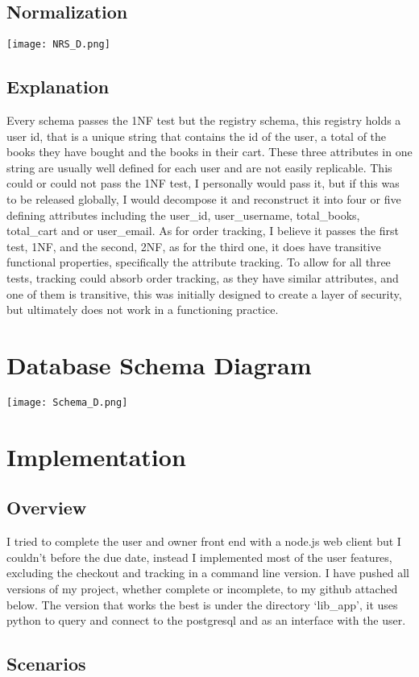\documentclass[a4 paper]{article}
\begin{document}
\subsection{Normalization}
{\centering \texttt{[image: NRS\_D.png]}}
\subsection{Explanation}
\qquad Every schema passes the 1NF test but the registry schema, this registry holds a user id, that is a unique string that contains the id of the user, a total of the books they have bought and the books in their cart. These three attributes in one string are usually well defined for each user and are not easily replicable. This could or could not pass the 1NF test, I personally would pass it, but if this was to be released globally, I would decompose it and reconstruct it into four or five defining attributes including the user\_id, user\_username, total\_books, total\_cart and or user\_email. As for order tracking, I believe it passes the first test, 1NF, and the second, 2NF, as for the third one, it does have transitive functional properties, specifically the attribute tracking. To allow for all three tests, tracking could absorb order tracking, as they have similar attributes, and one of them is transitive, this was initially designed to create a layer of security, but ultimately does not work in a functioning practice. 
\section{Database Schema Diagram}
{\centering \texttt{[image: Schema\_D.png]}}
\section{Implementation}
\subsection{Overview}
\qquad I tried to complete the user and owner front end with a node.js web client but I couldn't before the due date, instead I implemented most of the user features, excluding the checkout and tracking in a command line version. I have pushed all versions of my project, whether complete or incomplete, to my github attached below. The version that works the best is under the directory `lib\_app', it uses python to query and connect to the postgresql and as an interface with the user. 
\subsection{Scenarios}
\end{document}
